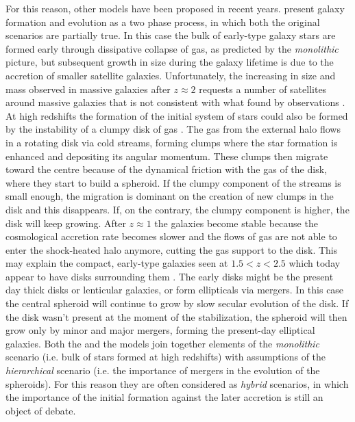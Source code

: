 	For this reason, other models have been proposed in recent years. 
	\citet{Oser10} present galaxy formation and evolution as a two phase process, in which 
	both the original scenarios are partially true. 
	In this case the bulk of early-type galaxy stars are formed early through dissipative collapse of gas, as predicted by the 
	\textit{monolithic} picture, but subsequent growth in size during the galaxy lifetime is due to the accretion of 
	smaller satellite galaxies. 
	Unfortunately, the increasing in size and mass observed in massive galaxies after $z\approx2$ requests a number 
	of satellites around massive galaxies that is not consistent with what found by observations \citep{Quilis12}.
	At high redshifts the formation of the initial system of stars could also be formed by the instability of a 
	clumpy disk of gas \citep{Dekel09}.
	The gas from the external halo flows in a rotating disk via cold streams, forming clumps where the star formation is 
	enhanced and depositing its angular momentum. 
	These clumps then migrate toward the centre because of the dynamical friction with the gas of the disk, where they 
	start to build a spheroid. 
	If the clumpy component of the streams is small enough, the migration is dominant on the creation of new clumps in 
	the disk and this disappears. 
	If, on the contrary, the clumpy component is higher, the disk will keep growing.
	After $z\approx1$ the galaxies become stable because the cosmological accretion rate becomes slower and the flows of gas 
	are not able to enter the shock-heated halo anymore, cutting the gas support to the disk. 
	This may explain the compact, early-type galaxies seen at $1.5 < z< 2.5$ which today appear to have disks surrounding 
	them \citep{Graham11, Dullo13}.
	The early disks might be the present day thick disks or lenticular galaxies, or form ellipticals via mergers. 
	In this case the central spheroid will continue to grow by slow secular evolution of the disk.
	If the disk wasn't present at the moment of the stabilization, the spheroid will then grow only by minor and major 
	mergers, forming the present-day elliptical galaxies. 
	Both the \citet{Oser10} and the \citet{Dekel09} models join together elements of the \textit{monolithic} scenario 
	(i.e. bulk of stars formed at high redshifts) with assumptions of the \textit{hierarchical} scenario (i.e. the 
	importance of mergers in the evolution of the spheroids). 	%
	For this reason they are often considered as \textit{hybrid} scenarios, in which the importance of the initial formation 
	against the later accretion is still an object of debate.	
	
